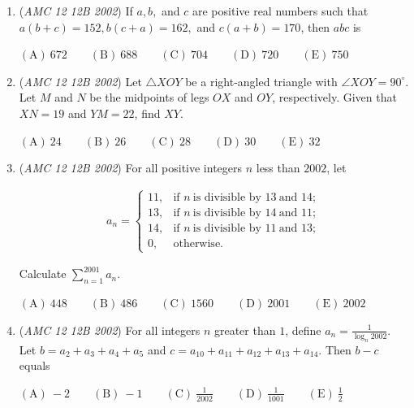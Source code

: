\begin{enumerate}
 

$\mathrm{(A)}\ \frac 12 \qquad\mathrm{(B)}\ \frac 23 \qquad\mathrm{(C)}\ \frac 34 \qquad\mathrm{(D)}\ \frac 45 \qquad\mathrm{(E)}\ 1$


	\item (\textit{AMC 12 12B 2002}) If $a,b,$ and $c$ are positive real numbers such that $a(b+c) = 152, b(c+a) = 162,$ and $c(a+b) = 170$, then $abc$ is


 $\mathrm{(A)}\ 672 \qquad\mathrm{(B)}\ 688 \qquad\mathrm{(C)}\ 704 \qquad\mathrm{(D)}\ 720 \qquad\mathrm{(E)}\ 750$


	\item (\textit{AMC 12 12B 2002}) Let $\triangle XOY$ be a right-angled triangle with $\angle XOY = 90^{\circ}$. Let $M$ and $N$ be the midpoints of legs $OX$ and $OY$, respectively. Given that $XN = 19$ and $YM = 22$, find $XY$.


 $\mathrm{(A)}\ 24 \qquad\mathrm{(B)}\ 26 \qquad\mathrm{(C)}\ 28 \qquad\mathrm{(D)}\ 30 \qquad\mathrm{(E)}\ 32$


	\item (\textit{AMC 12 12B 2002}) For all positive integers $n$ less than $2002$, let 


 
 \begin{eqnarray*} a_n =\left\{ \begin{array}{lr} 11, & \text{if\ }n\ \text{is\ divisible\ by\ }13\ \text{and\ }14;\\ 13, & \text{if\ }n\ \text{is\ divisible\ by\ }14\ \text{and\ }11;\\ 14, & \text{if\ }n\ \text{is\ divisible\ by\ }11\ \text{and\ }13;\\ 0, & \text{otherwise}. \end{array} \right. \end{eqnarray*}


 Calculate $\sum_{n=1}^{2001} a_n$.


 $\mathrm{(A)}\ 448 \qquad\mathrm{(B)}\ 486 \qquad\mathrm{(C)}\ 1560 \qquad\mathrm{(D)}\ 2001 \qquad\mathrm{(E)}\ 2002$


	\item (\textit{AMC 12 12B 2002}) For all integers $n$ greater than $1$, define $a_n = \frac{1}{\log_n 2002}$. Let $b = a_2 + a_3 + a_4 + a_5$ and $c = a_{10} + a_{11} + a_{12} + a_{13} + a_{14}$. Then $b- c$ equals


 $\mathrm{(A)}\ -2 \qquad\mathrm{(B)}\ -1  \qquad\mathrm{(C)}\ \frac{1}{2002} \qquad\mathrm{(D)}\ \frac{1}{1001} \qquad\mathrm{(E)}\ \frac 12$



\end{enumerate}
